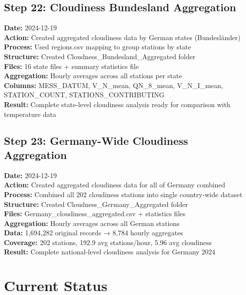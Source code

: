 \documentclass[11pt,a4paper]{article}
\begin{document}
\subsection{Step 22: Cloudiness Bundesland Aggregation}
\textbf{Date:} 2024-12-19\\
\textbf{Action:} Created aggregated cloudiness data by German states (Bundesländer)\\
\textbf{Process:} Used regions.csv mapping to group stations by state\\
\textbf{Structure:} Created Cloudness\_Bundesland\_Aggregated folder\\
\textbf{Files:} 16 state files + summary statistics file\\
\textbf{Aggregation:} Hourly averages across all stations per state\\
\textbf{Columns:} MESS\_DATUM, V\_N\_mean, QN\_8\_mean, V\_N\_I\_mean, STATION\_COUNT, STATIONS\_CONTRIBUTING\\
\textbf{Result:} Complete state-level cloudiness analysis ready for comparison with temperature data

\subsection{Step 23: Germany-Wide Cloudiness Aggregation}
\textbf{Date:} 2024-12-19\\
\textbf{Action:} Created aggregated cloudiness data for all of Germany combined\\
\textbf{Process:} Combined all 202 cloudiness stations into single country-wide dataset\\
\textbf{Structure:} Created Cloudness\_Germany\_Aggregated folder\\
\textbf{Files:} Germany\_cloudiness\_aggregated.csv + statistics files\\
\textbf{Aggregation:} Hourly averages across all German stations\\
\textbf{Data:} 1,694,282 original records → 8,784 hourly aggregates\\
\textbf{Coverage:} 202 stations, 192.9 avg stations/hour, 5.96 avg cloudiness\\
\textbf{Result:} Complete national-level cloudiness analysis for Germany 2024

\section{Current Status}
\end{document}
